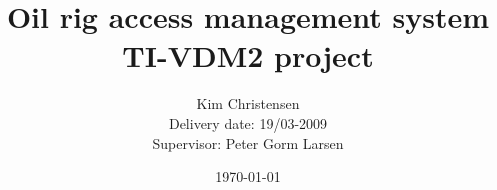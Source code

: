 \documentclass[a4paper,twoside,12pt,english,notitlepage]{report}
\begin{document}
\title{Oil rig access management system\\
TI-VDM2 project}
\author{Kim Christensen \\
Delivery date: 19/03-2009 \\
Supervisor: Peter Gorm Larsen}
\date{\today}
\maketitle
\cleardoublepage
\newpage

\tableofcontents

% 
% 
% 
% 
% 
% 

\printindex

\newpage















\end{document}
